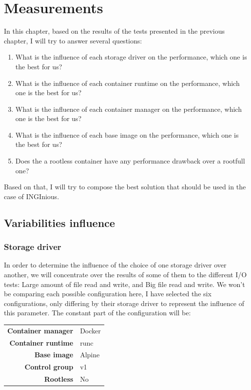 \chapter{Measurements}

In this chapter, based on the results of the tests presented in the previous chapter, I will try to answer several questions:
\begin{enumerate}
  \item What is the influence of each storage driver on the performance, which one is the best for us?
  \item What is the influence of each container runtime on the performance, which one is the best for us?
  \item What is the influence of each container manager on the performance, which one is the best for us?
  \item What is the influence of each base image on the performance, which one is the best for us?
  \item Does the a rootless container have any performance drawback over a rootfull one?
\end{enumerate}

Based on that, I will try to compose the best solution that should be used in the case of INGInious.

\section{Variabilities influence}

\subsection{Storage driver}
In order to determine the influence of the choice of one storage driver over another, we will concentrate over the results of some of them to the different I/O tests: Large amount of file read and write, and Big file read and write.
We won't be comparing each possible configuration here, I have selected the six configurations, only differing by their storage driver to represent the influence of this parameter.  The constant part of the configuration will be:

\begin{tabular}{rl}
   \textbf{Container manager} & Docker \\
   \textbf{Container runtime} & runc \\
   \textbf{Base image} & Alpine \\
   \textbf{Control group} & v1 \\
   \textbf{Rootless} & No 
\end{tabular}


